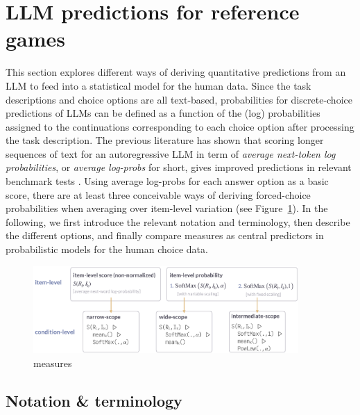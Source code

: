 \documentclass{article}
\begin{document}
\section{LLM predictions for reference games}
\label{llm-predictions-for-reference-games}

This section explores different ways of deriving quantitative predictions from an LLM to feed into a statistical model for the human data.
Since the task descriptions and choice options are all text-based, probabilities for discrete-choice predictions of LLMs can be defined as a function of the (log) probabilities assigned to the continuations corresponding to each choice option after processing the task description.
The previous literature has shown that scoring longer sequences of text for an autoregressive LLM in term of \emph{average next-token log probabilities}, or \emph{average log-probs} for short, gives improved predictions in relevant benchmark tests \citep[e.g.,][]{BrownMann2020:Language-Models}.
Using average log-probs for each answer option as a basic score, there are at least three conceivable ways of deriving forced-choice probabilities when averaging over item-level variation (see Figure~\ref{fig:measures-overview}).
In the following, we first introduce the relevant notation and terminology, then describe the different options, and finally compare measures as central predictors in probabilistic models for the human choice data.

\begin{figure}
  \centering
  \includegraphics[width=0.9\textwidth]{00-pics/measures-overview.png}
  \caption{measures}
  \label{fig:measures-overview}
\end{figure}

\subsection{Notation \& terminology}
\label{sec:notat--term}
\end{document}
